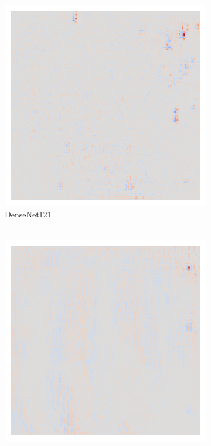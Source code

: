 \begin{figure}[H]
    \centering
     \\
    \begin{subfigure}{0.16\linewidth} %
        \centering
        \includegraphics[height=1\linewidth]{01-images/05-resultate/uap_densenet121/uap0-densenet121-covidx_data-n200-robustificationslevel0.png}
        \caption{DenseNet121\\\textcolor{white}{Chandelure}}
    \end{subfigure}\hfill%
    \begin{subfigure}{0.16\linewidth}
        \centering
        \includegraphics[height=1\linewidth]{01-images/05-resultate/uap_densenet169/uap0-densenet169-covidx_data-n200-robustificationslevel0.png}

\end{subfigure}
\end{figure}
